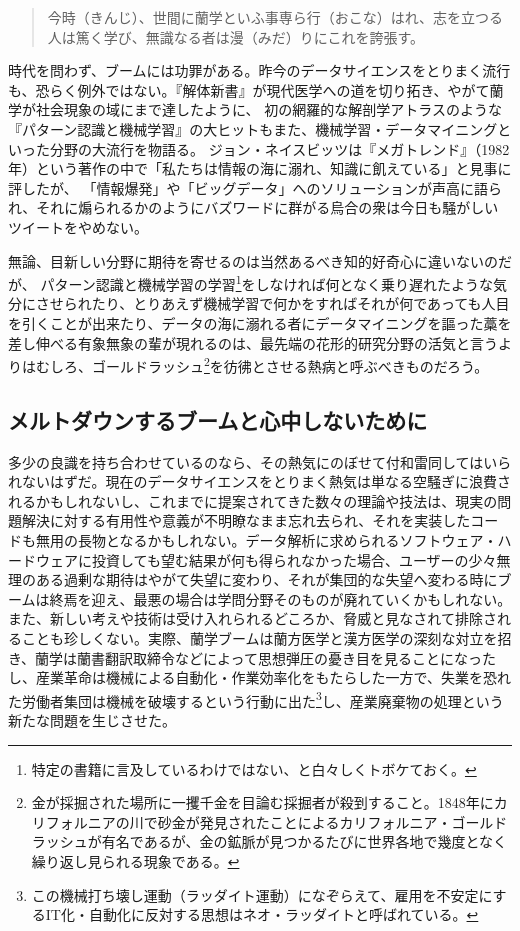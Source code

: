 \begin{quote}
今時（きんじ）、世間に蘭学といふ事専ら行（おこな）はれ、志を立つる人は篤く学び、無識なる者は漫（みだ）りにこれを誇張す。
\end{quote}

時代を問わず、ブームには功罪がある。昨今のデータサイエンスをとりまく流行も、恐らく例外ではない。『解体新書』が現代医学への道を切り拓き、やがて蘭学が社会現象の域にまで達したように、
初の網羅的な解剖学アトラスのような『パターン認識と機械学習』の大ヒットもまた、機械学習・データマイニングといった分野の大流行を物語る。
ジョン・ネイスビッツは『メガトレンド』（1982年）という著作の中で「私たちは情報の海に溺れ、知識に飢えている」と見事に評したが、
「情報爆発」や「ビッグデータ」へのソリューションが声高に語られ、それに煽られるかのようにバズワードに群がる烏合の衆は今日も騒がしいツイートをやめない。

無論、目新しい分野に期待を寄せるのは当然あるべき知的好奇心に違いないのだが、
パターン認識と機械学習の学習\footnote{特定の書籍に言及しているわけではない、と白々しくトボケておく。}をしなければ何となく乗り遅れたような気分にさせられたり、とりあえず機械学習で何かをすればそれが何であっても人目を引くことが出来たり、データの海に溺れる者にデータマイニングを謳った藁を差し伸べる有象無象の輩が現れるのは、最先端の花形的研究分野の活気と言うよりはむしろ、ゴールドラッシュ\footnote{金が採掘された場所に一攫千金を目論む採掘者が殺到すること。1848年にカリフォルニアの川で砂金が発見されたことによるカリフォルニア・ゴールドラッシュが有名であるが、金の鉱脈が見つかるたびに世界各地で幾度となく繰り返し見られる現象である。}を彷彿とさせる熱病と呼ぶべきものだろう。

\subsection{メルトダウンするブームと心中しないために}
多少の良識を持ち合わせているのなら、その熱気にのぼせて付和雷同してはいられないはずだ。現在のデータサイエンスをとりまく熱気は単なる空騒ぎに浪費されるかもしれないし、これまでに提案されてきた数々の理論や技法は、現実の問題解決に対する有用性や意義が不明瞭なまま忘れ去られ、それを実装したコードも無用の長物となるかもしれない。データ解析に求められるソフトウェア・ハードウェアに投資しても望む結果が何も得られなかった場合、ユーザーの少々無理のある過剰な期待はやがて失望に変わり、それが集団的な失望へ変わる時にブームは終焉を迎え、最悪の場合は学問分野そのものが廃れていくかもしれない。
また、新しい考えや技術は受け入れられるどころか、脅威と見なされて排除されることも珍しくない。実際、蘭学ブームは蘭方医学と漢方医学の深刻な対立を招き、蘭学は蘭書翻訳取締令などによって思想弾圧の憂き目を見ることになったし、産業革命は機械による自動化・作業効率化をもたらした一方で、失業を恐れた労働者集団は機械を破壊するという行動に出た\footnote{この機械打ち壊し運動（ラッダイト運動）になぞらえて、雇用を不安定にするIT化・自動化に反対する思想はネオ・ラッダイトと呼ばれている。}し、産業廃棄物の処理という新たな問題を生じさせた。

